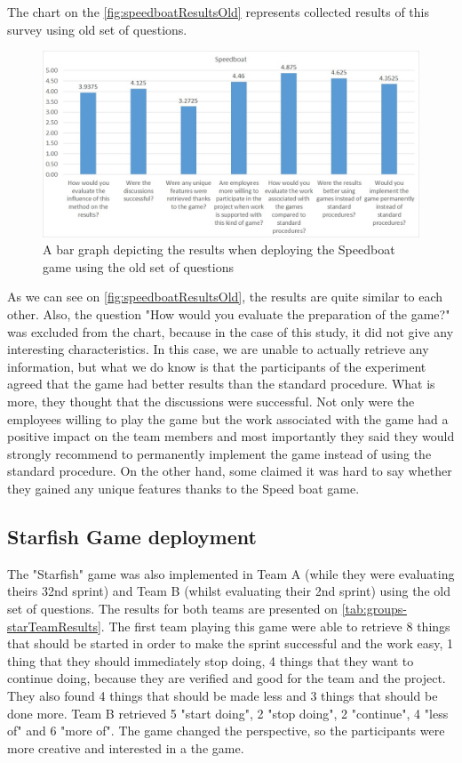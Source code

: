The chart on the \autoref{fig:speedboatResultsOld} represents collected results of this survey using old set of questions.

\begin{figure}[!htbp]
\caption{A bar graph depicting the results when deploying the Speedboat game using the old set of questions}
\label{fig:speedboatResultsOld}
\centering
\includegraphics[width=1\textwidth]{charts/speedboatOldSet}
\end{figure}

As we can see on \autoref{fig:speedboatResultsOld}, the results are quite similar to each other. Also, the question "How would you evaluate the preparation of the game?" was excluded from the chart, because in the case of this study, it did not give any interesting characteristics. In this case, we are unable to actually retrieve any information, but what we do know is that the participants of the experiment agreed that the game had better results than the standard procedure. What is more, they thought that the discussions were successful. Not only were the employees willing to play the game but the work associated with the game had a positive impact on the team members and most importantly they said they would strongly recommend to permanently implement the game instead of using the standard procedure. On the other hand, some claimed it was hard to say
whether they gained any unique features thanks to the Speed boat game.

\subsection{Starfish Game deployment}

The "Starfish" game was also implemented in Team A (while they were evaluating theirs 32nd sprint) and Team B (whilst evaluating their 2nd sprint) using the old set of questions. The results for both teams are presented on \autoref{tab:groups-starTeamResults}. The first team playing this game were able to retrieve 8 things that should be started in order to make the sprint successful and the work easy, 1 thing that they should immediately stop doing, 4 things that they want to continue doing, because they are verified and good for the team and the project. They also found 4 things that should be made less and 3 things that should be done more. Team B retrieved 5 "start doing", 2 "stop doing", 2 "continue", 4 "less of" and 6 "more of". The game changed the perspective, so the participants were more creative and interested in a the game.

